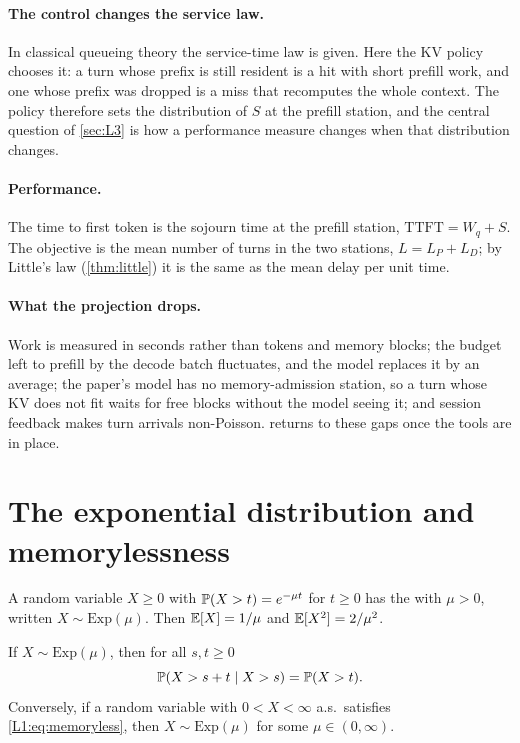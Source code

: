 \paragraph{The control changes the service law.} In classical queueing theory the
service-time law is given. Here the KV policy chooses it: a turn whose prefix is still
resident is a hit with short prefill work, and one whose prefix was dropped is a miss
that recomputes the whole context. The policy therefore sets the distribution of $S$ at
the prefill station, and the central question of \cref{sec:L3} is how a performance
measure changes when that distribution changes.

\paragraph{Performance.} The time to first token is the sojourn time at the prefill
station, $\mathrm{TTFT}=W_q+S$. The objective is the mean number of turns in the two
stations, $L=L_P+L_D$; by Little's law (\cref{thm:little}) it is the same as the mean
delay per unit time.

\paragraph{What the projection drops.} Work is measured in seconds rather than tokens
and memory blocks; the budget left to prefill by the decode batch fluctuates, and the
model replaces it by an average; the paper's model has no memory-admission station, so
a turn whose KV does not fit waits for free blocks without the model seeing it; and
session feedback makes turn arrivals non-Poisson.
 returns to these gaps once the tools are in place.

\section{The exponential distribution and memorylessness}

\begin{definition}\label{L1:def:exp}
A random variable $X\ge0$ with $\mathbb{P}(X>t)=e^{-\mu t}$ for $t\ge0$ has the
 with  $\mu>0$, written
$X\sim\mathrm{Exp}(\mu)$. Then $\mathbb{E}[X]=1/\mu$ and $\mathbb{E}[X^2]=2/\mu^2$.
\end{definition}

\begin{proposition}\label{prop:memoryless}
If $X\sim\mathrm{Exp}(\mu)$, then for all $s,t\ge0$
\begin{equation}\label{L1:eq:memoryless}
  \mathbb{P}(X>s+t\mid X>s)=\mathbb{P}(X>t).
\end{equation}
Conversely, if a random variable with $0<X<\infty$ a.s.\ satisfies
\eqref{L1:eq:memoryless}, then $X\sim\mathrm{Exp}(\mu)$ for some $\mu\in(0,\infty)$.
\end{proposition}

